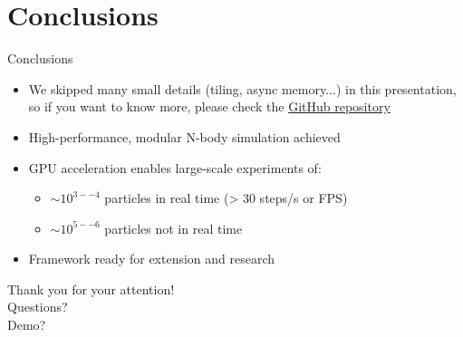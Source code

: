 \documentclass{beamer}
\begin{document}
\section{Conclusions}
\begin{frame}{Conclusions}
    \begin{itemize}
        \item We skipped many small details (tiling, async memory...) in this presentation, so if you want to know more, please check the \href{https://github.com/tusca99/N-body-simulation.git}{GitHub repository}
        \item High-performance, modular N-body simulation achieved
        \item GPU acceleration enables large-scale experiments of:
            \begin{itemize}
            \item $\sim 10^{3--4}$ particles in real time (> 30 steps/s or FPS)
            \item $\sim 10^{5--6}$ particles not in real time
            \end{itemize}
        \item Framework ready for extension and research
    \end{itemize}
\end{frame}

\begin{emptyframe}
    \centering
    Thank you for your attention! \\
    Questions? \\
    Demo?
\end{emptyframe}
\end{document}
